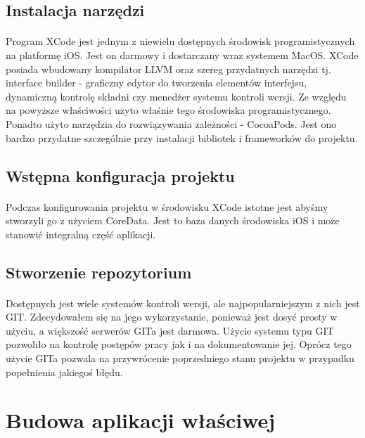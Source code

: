 \documentclass[12pt,oneside,a4paper]{report}
\begin{document}
\subsection{Instalacja narzędzi}
\paragraph{}Program XCode jest jednym z niewielu dostępnych środowisk programistycznych na platformę iOS. Jest on darmowy i dostarczany wraz systemem MacOS. XCode posiada wbudowany kompilator LLVM oraz szereg przydatnych narzędzi tj. interface builder - graficzny edytor do tworzenia elementów interfejsu, dynamiczną kontrolę składni czy menedżer systemu kontroli wersji. Ze względu na powyższe właściwości użyto właśnie tego środowiska programistycznego.
Ponadto użyto narzędzia do rozwiązywania zależności - CocoaPods. Jest ono bardzo przydatne szczególnie przy instalacji bibliotek i frameworków do projektu.  
\subsection{Wstępna konfiguracja projektu}
\paragraph{}Podczas konfigurowania projektu w środowisku XCode istotne jest abyśmy stworzyli go z użyciem CoreData. Jest to baza danych środowiska iOS i może stanowić integralną część aplikacji.   
\subsection{Stworzenie repozytorium}
\paragraph{}Dostępnych jest wiele systemów kontroli wersji, ale najpopularniejszym z nich jest GIT. Zdecydowałem się na jego wykorzystanie, ponieważ jest dosyć prosty w użyciu, a większość serwerów GITa jest darmowa. Użycie systemu typu GIT pozwoliło na kontrolę postępów pracy jak i na dokumentowanie jej. Oprócz tego użycie GITa pozwala na przywrócenie poprzedniego stanu projektu w przypadku popełnienia jakiegoś błędu.
\pagebreak
\section{Budowa aplikacji właściwej}
\end{document}
